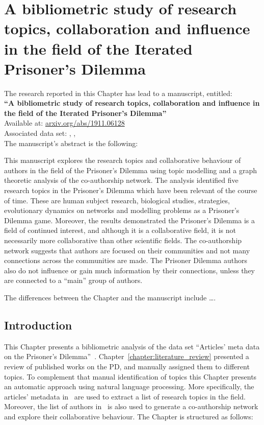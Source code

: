 \chapter{A bibliometric study of research topics, collaboration and influence in
the field of the Iterated Prisoner's Dilemma}\label{chapter:bibliometric_study}

\begin{center}
    The research reported in this Chapter has lead to a manuscript, entitled: \\
    \textbf{``A bibliometric study of research topics, collaboration and influence in the field of the Iterated Prisoner's Dilemma''} \\
    Available at: \url{arxiv.org/abs/1911.06128} \\
    Associated data set: \cite{auction_data_2018}, \cite{anarchy_data_2018}, \cite{pd_data_2018}\\ \vspace{.5cm}
    The manuscript's abstract is the following:
\end{center}

This manuscript explores the research topics and collaborative behaviour of
authors in the field of the Prisoner's Dilemma using topic modelling and a graph
theoretic analysis of the co-authorship network. The analysis identified five
research topics in the Prisoner's Dilemma which have been relevant of the course
of time. These are human subject research, biological studies, strategies,
evolutionary dynamics on networks and modelling problems as a Prisoner's Dilemma
game. Moreover, the results demonstrated the Prisoner's Dilemma is a field of
continued interest, and although it is a collaborative field, it is not
necessarily more collaborative than other scientific fields. The co-authorship
network suggests that authors are focused on their communities and not many
connections across the communities are made. The Prisoner Dilemma authors also
do not influence or gain much information by their connections, unless they are
connected to a ``main'' group of authors.

The differences between the Chapter and the manuscript include \dots.   %
\newpage

\section{Introduction}\label{section:introduction}

This Chapter presents a bibliometric analysis of the data set
``Articles' meta data on the Prisoner's Dilemma''~\cite{pd_data_2018}.
Chapter~\ref{chapter:literature_review} presented a review of published works on
the PD, and manually assigned them to different topics. To complement that
manual identification of topics this Chapter presents an automatic approach
using natural language processing. More specifically, the \totalarticles articles' metadata
in~\cite{pd_data_2018} are used to extract a list of research topics in the field.
Moreover, the list of authors in~\cite{pd_data_2018} is also used to generate a
co-authorship network and explore their collaborative behaviour.
The Chapter is structured as follows:

